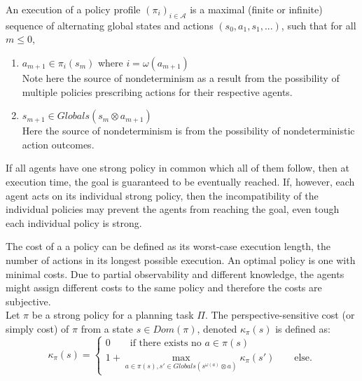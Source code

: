 An execution of a policy profile $(\pi_i)_{i \in \mathcal{A}}$ is a maximal (finite or infinite) sequence of alternating global states and actions $(s_0, a_1, s_1,...)$, such that for all $m \leq 0$,
\begin{enumerate}
  \item $a_{m+1} \in \pi_i(s_m)$ where $i=\omega(a_{m+1})$ \\
    Note here the source of nondeterminism as a result from the possibility of multiple policies prescribing actions for their respective agents.
  \item $s_{m+1} \in Globals(s_m \otimes a_{m+1}) $ \\
    Here the source of nondeterminism is from the possibility of nondeterministic action outcomes.
\end{enumerate}


If all agents have one strong policy in common which all of them follow, then at execution time, the goal is guaranteed to be eventually reached. If, however, each agent acts on its individual strong policy, then the incompatibility of the individual policies may prevent the agents from reaching the goal, even tough each individual policy is strong.



The cost of a a policy can be defined as its worst-case execution length, the number of actions in its longest possible execution. An optimal policy is one with minimal costs. Due to partial observability and different knowledge, the agents might assign different costs to the same policy and therefore the costs are subjective. \\
Let $\pi$ be a strong policy for a planning task $\Pi$. The perspective-sensitive cost (or simply cost) of $\pi$ from a state $s\in Dom(\pi)$, denoted $\kappa_{\pi}(s)$ is defined as:
$$\kappa_{\pi}(s) =
\begin{cases}
0 \qquad \text{if there exists no } a \in \pi(s)\\
1+ \max_{a\in \pi(s), s'\in Globals(s^{\omega(a)} \otimes a)} \kappa_{\pi}(s') \qquad \text{else.}
\end{cases}$$

